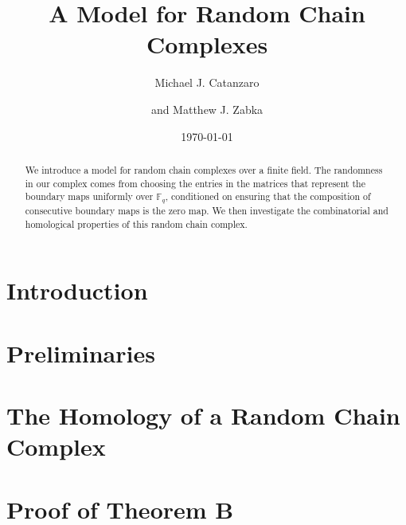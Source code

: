 \documentclass{amsart}
\title{A Model for Random Chain Complexes}
\author{Michael J. Catanzaro \and and Matthew J. Zabka}
\date{\today}
\theoremstyle{remark}
\begin{document}
\begin{abstract}
We introduce a model for random chain complexes over a finite
field. The randomness in our complex comes from choosing the entries in the
matrices that represent the boundary maps uniformly over $\mathbb{F}_q$,
conditioned on ensuring that the composition of consecutive boundary maps is
the zero map.  We then investigate the combinatorial and homological 
properties of this random chain complex.
\end{abstract}
\maketitle


\section{Introduction}

\section{Preliminaries}

\section{The Homology of a Random Chain Complex}\label{SecCondComp}

\section{Proof of Theorem B}

%



  
\end{document}
